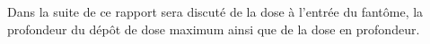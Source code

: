 \documentclass{book}
\begin{document}
Dans la suite de ce rapport sera discuté de la dose à l'entrée du fantôme, la profondeur du dépôt de dose maximum ainsi que de la dose en profondeur.










\end{document}
